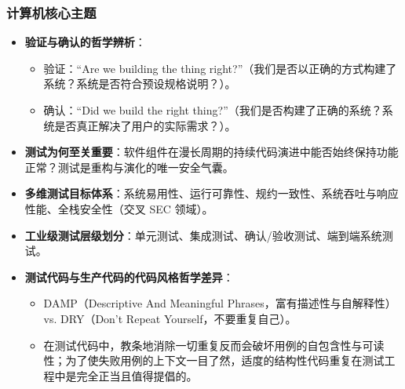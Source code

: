 \subsubsection{计算机核心主题}
\begin{itemize}
    \item \textbf{验证与确认的哲学辨析}：
    \begin{itemize}
        \item 验证：“Are we building the thing right?”（我们是否以正确的方式构建了系统？系统是否符合预设规格说明？）。
        \item 确认：“Did we build the right thing?”（我们是否构建了正确的系统？系统是否真正解决了用户的实际需求？）。
    \end{itemize}
    \item \textbf{测试为何至关重要}：软件组件在漫长周期的持续代码演进中能否始终保持功能正常？测试是重构与演化的唯一安全气囊。
    \item \textbf{多维测试目标体系}：系统易用性、运行可靠性、规约一致性、系统吞吐与响应性能、全栈安全性（交叉 SEC 领域）。
    \item \textbf{工业级测试层级划分}：单元测试、集成测试、确认/验收测试、端到端系统测试。
    \item \textbf{测试代码与生产代码的代码风格哲学差异}：
    \begin{itemize}
        \item DAMP（Descriptive And Meaningful Phrases，富有描述性与自解释性）vs. DRY（Don't Repeat Yourself，不要重复自己）。
        \item 在测试代码中，教条地消除一切重复反而会破坏用例的自包含性与可读性；为了使失败用例的上下文一目了然，适度的结构性代码重复在测试工程中是完全正当且值得提倡的。
    \end{itemize}
\end{itemize}

